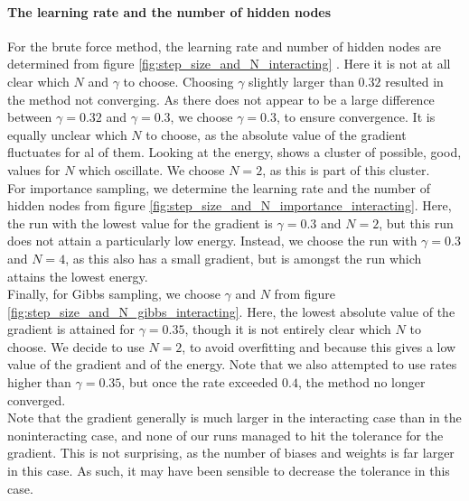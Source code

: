 \documentclass[a4paper, 10pt]{article}
\begin{document}
\paragraph{The learning rate and the number of hidden nodes}
For the brute force method, the learning rate and number of hidden nodes are determined from figure \ref{fig:step_size_and_N_interacting} . Here it is not at all clear which $N$ and $\gamma$ to choose. Choosing $\gamma$ slightly larger than $0.32$ resulted in the method not converging. As there does not appear to be a large difference between $\gamma=0.32$ and $\gamma=0.3$, we choose $\gamma=0.3$, to ensure convergence. It is equally unclear which $N$ to choose, as the absolute value of the gradient fluctuates for al of them. Looking at the energy, shows a cluster of possible, good, values for $N$ which oscillate. We choose $N=2$, as this is part of this cluster.\\
\linebreak
For importance sampling, we determine the learning rate and the number of hidden nodes from figure \ref{fig:step_size_and_N_importance_interacting}. Here, the run with the lowest value for the gradient is $\gamma=0.3$ and $N=2$, but this run does not attain a particularly low energy. Instead, we choose the run with $\gamma=0.3$ and $N=4$, as this also has a small gradient, but is amongst the run which attains the lowest energy.\\
\linebreak
Finally, for Gibbs sampling, we choose $\gamma$ and $N$ from figure \ref{fig:step_size_and_N_gibbs_interacting}. Here, the lowest absolute value of the gradient is attained for $\gamma=0.35$, though it is not entirely clear which $N$ to choose. We decide to use $N=2$, to avoid overfitting and because this gives a low value of the gradient and of the energy. Note that we also attempted to use rates higher than $\gamma=0.35$, but once the rate exceeded $0.4$, the method no longer converged.\\
\linebreak
Note that the gradient generally is much larger in the interacting case than in the noninteracting case, and none of our runs managed to hit the tolerance for the gradient. This is not surprising, as the number of biases and weights is far larger in this case. As such, it may have been sensible to decrease the tolerance in this case.
\end{document}

